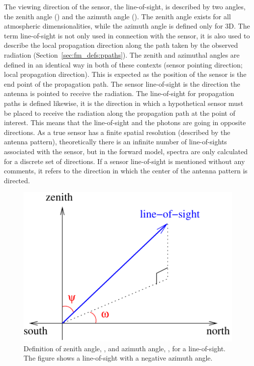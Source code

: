 The viewing direction of the sensor, the line-of-sight, is described
by two angles, the zenith angle (\ZntAng) and the azimuth angle
(\AzmAng). The zenith angle exists for all atmospheric
dimensionalities, while the azimuth angle is defined only for 3D.
The term line-of-sight is not only used in connection with the sensor,
it is also used to describe the local propagation direction along the
path taken by the observed radiation
(Section~\ref{sec:fm_defs:ppaths}).  The zenith and azimuthal angles
are defined in an identical way in both of these contexts (sensor
pointing direction; local propagation direction). This is expected as
the position of the sensor is the end point of the propagation path.
The sensor line-of-sight is the direction the antenna is pointed to
receive the radiation. The line-of-sight for propagation paths is
defined likewise, it is the direction in which a hypothetical sensor
must be placed to receive the radiation along the propagation path at
the point of interest. This means that the line-of-sight and the
photons are going in opposite directions. As a true sensor has a
finite spatial resolution (described by the antenna pattern),
theoretically there is an infinite number of line-of-sights associated
with the sensor, but in the forward model, spectra are only calculated
for a discrete set of directions. If a sensor line-of-sight is
mentioned without any comments, it refers to the direction in which
the center of the antenna pattern is directed.

\begin{figure}[!t]
 \begin{center}
  \begin{minipage}[c]{0.6\textwidth}
   \includegraphics*[width=0.99\hsize]{Figs/fm_definitions/za_and_aa_angles}
  \end{minipage}%
  \begin{minipage}[c]{0.4\textwidth}
   \caption{Definition of zenith angle, \ZntAng, and azimuth angle, 
       \AzmAng, for a line-of-sight. The figure shows a line-of-sight
       with a negative azimuth angle.}
   \label{fig:fm_defs:los}
  \end{minipage}
 \end{center}
\end{figure}           
 
